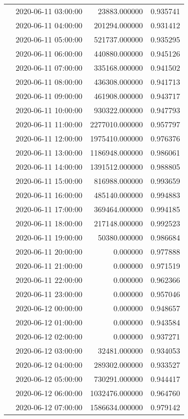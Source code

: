 \begin{tabular}{llrr}
 & 2020-06-11 03:00:00 & 23883.000000 & 0.935741 \\
 & 2020-06-11 04:00:00 & 201294.000000 & 0.931412 \\
 & 2020-06-11 05:00:00 & 521737.000000 & 0.935295 \\
 & 2020-06-11 06:00:00 & 440880.000000 & 0.945126 \\
 & 2020-06-11 07:00:00 & 335168.000000 & 0.941502 \\
 & 2020-06-11 08:00:00 & 436308.000000 & 0.941713 \\
 & 2020-06-11 09:00:00 & 461908.000000 & 0.943717 \\
 & 2020-06-11 10:00:00 & 930322.000000 & 0.947793 \\
 & 2020-06-11 11:00:00 & 2277010.000000 & 0.957797 \\
 & 2020-06-11 12:00:00 & 1975410.000000 & 0.976376 \\
 & 2020-06-11 13:00:00 & 1186948.000000 & 0.986061 \\
 & 2020-06-11 14:00:00 & 1391512.000000 & 0.988805 \\
 & 2020-06-11 15:00:00 & 816988.000000 & 0.993659 \\
 & 2020-06-11 16:00:00 & 485140.000000 & 0.994883 \\
 & 2020-06-11 17:00:00 & 369464.000000 & 0.994185 \\
 & 2020-06-11 18:00:00 & 217148.000000 & 0.992523 \\
 & 2020-06-11 19:00:00 & 50380.000000 & 0.986684 \\
 & 2020-06-11 20:00:00 & 0.000000 & 0.977888 \\
 & 2020-06-11 21:00:00 & 0.000000 & 0.971519 \\
 & 2020-06-11 22:00:00 & 0.000000 & 0.962366 \\
 & 2020-06-11 23:00:00 & 0.000000 & 0.957046 \\
 & 2020-06-12 00:00:00 & 0.000000 & 0.948657 \\
 & 2020-06-12 01:00:00 & 0.000000 & 0.943584 \\
 & 2020-06-12 02:00:00 & 0.000000 & 0.937271 \\
 & 2020-06-12 03:00:00 & 32481.000000 & 0.934053 \\
 & 2020-06-12 04:00:00 & 289302.000000 & 0.933527 \\
 & 2020-06-12 05:00:00 & 730291.000000 & 0.944417 \\
 & 2020-06-12 06:00:00 & 1032476.000000 & 0.964760 \\
 & 2020-06-12 07:00:00 & 1586634.000000 & 0.979142 \\

\end{tabular}
